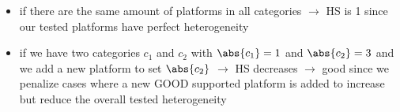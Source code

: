 \begin{itemize}
    \item if there are the same amount of platforms in all categories $\rightarrow$ HS is 1 since our tested platforms have perfect heterogeneity 
    \item if we have two categories $c_1$ and $c_2$ with $\abs{c_1} = 1$ and $\abs{c_2} = 3$ and we add a new platform to set $\abs{c_2}$ $\rightarrow$ HS decreases $\rightarrow$ good since we penalize cases where a new GOOD supported platform is added to increase \pp but reduce the overall tested heterogeneity 
\end{itemize}
